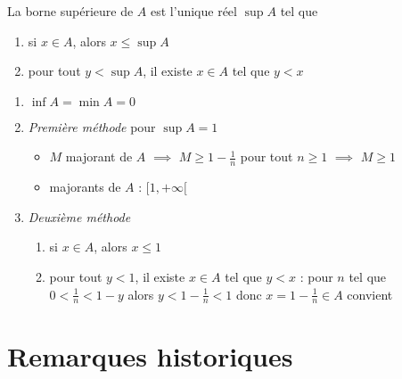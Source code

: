 \begin{frame}
\begin{proposition}
La borne supérieure de $A$ est l'unique réel $\sup A$ tel que
\begin{enumerate}
\item[(i)] si $x\in A$, alors $x\leq \sup A$
\item[(ii)] pour tout $y<\sup A$, il existe $x\in A$ tel que $y<x$
\end{enumerate}
\end{proposition}

\pause

\begin{exemple}[$A=\big\{ 1-\frac{1}{n} \mid n\in \Nn^* \big\}$]
\vspace*{-6ex}
\pause
\begin{enumerate}
  \item $\inf A= \min A=0$
\pause
  \item \emph{Première méthode} pour $\sup A=1$
  \begin{itemize}
\pause
    \item $M$ majorant de $A$ $\implies$ $M \ge 1-\frac 1n$ pour tout $n\ge 1$ $\implies$ $M\ge 1$
\pause
    \item majorants de $A$ : $[1,+\infty[$
  \end{itemize}
\pause
  \item \emph{Deuxième méthode} 
\pause
  \begin{enumerate}
     \item[(i)] si $x\in A$, alors $x\leq 1$
\pause
     \item[(ii)] pour tout $y< 1$, il existe $x\in A$ tel que $y<x$ \pause :
pour $n$ tel que $0<\frac 1n < 1-y$ alors $y < 1-\frac 1n < 1$
\pause donc $x=1-\frac 1n \in A$ convient
   \end{enumerate} 
\end{enumerate}
\end{exemple}
\end{frame}



\section*{Remarques historiques}


